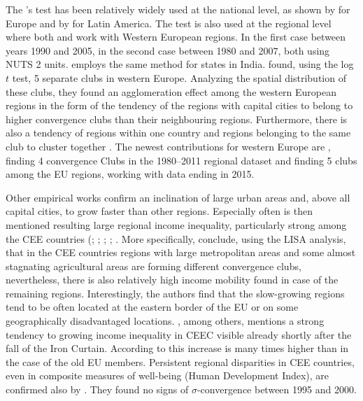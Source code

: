 \documentclass[11pt]{article}
\begin{document}
The \cite{phillips2007transition}'s test
has been relatively widely used at the national level, as shown by \citet{borsi2015evolution, fritsche2011analysing, monfort2013real,apergis2010old} for Europe and by \citet{rodriguez2014there} for Latin America. The test is also used at the regional level where both \citet{bartkowska2012regional} and \citet{pinho2010regional} work with Western European regions. In the first case between years 1990 and 2005, in the second case between 1980 and 2007, both using NUTS 2 units. \citet{ghosh2013regional} employs the same method for states in India. \citet{bartkowska2012regional} found, using the log $t$ test, 5 separate clubs in western Europe. Analyzing the spatial distribution of these clubs, they found an agglomeration effect among the western European regions in the form of the tendency of the regions with capital cities to belong to higher convergence clubs than their neighbouring regions. Furthermore, there is also a tendency of regions within one country and regions belonging to the same club to cluster together \citep{bartkowska2012regional}. The newest contributions for western Europe are \citet{von2017regional}, finding 4 convergence Clubs in the 1980–2011 regional dataset and \citet{cutrini2019economic} finding 5 clubs among the EU regions, working with data ending in 2015. 

Other empirical works confirm an inclination of large urban areas and, above all capital cities, to grow faster than other regions. Especially often is then mentioned resulting large regional income inequality, particularly strong among the CEE countries (\citet{cuaresma2014determinants}; \citet{sme2012regional}; \citet{szendi2013convergence}; \citet{chapman2012income}; \citet{monastiriotis2011regional}. 
More specifically, \citet{sme2012regional} conclude, using the LISA analysis, that in the CEE countries regions with large metropolitan areas and some almost stagnating agricultural areas are forming different convergence clubs, nevertheless, there is also relatively high income mobility found in case of the remaining regions. Interestingly, the authors find that the slow-growing regions tend to be often located at the eastern border of the EU or on some geographically disadvantaged locations. \citet{monastiriotis2011regional}, among others, mentions a strong tendency to growing income inequality in CEEC visible already shortly after the fall of the Iron Curtain. According to \citeauthor{monastiriotis2011regional} this increase is many times higher than in the case of the old EU members. Persistent regional disparities in CEE countries, even in composite measures of well-being (Human Development Index), are confirmed also by \citet{benedek2015paths}. They found no signs of $\sigma$-convergence between 1995 and 2000.  
\end{document}
